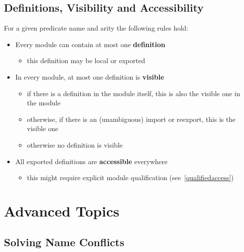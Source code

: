 \subsection{Definitions, Visibility and Accessibility}

For a given predicate name and arity the following rules hold:

\begin{itemize}
\item Every module can contain at most one {\bf definition}
    \begin{itemize}
    \item this definition may be local or exported
    \end{itemize}
\item In every module, at most one definition is {\bf visible}
    \begin{itemize}
    \item if there is a definition in the module itself,
	this is also the visible one in the module
    \item otherwise, if there is an (unambiguous) import or reexport,
	this is the visible one
    \item otherwise no definition is visible
    \end{itemize}
\item All exported definitions are {\bf accessible} everywhere
    \begin{itemize}
    \item this might require explicit module qualification
	(see~\ref{qualifiedaccess})
    \end{itemize}
\end{itemize}


\section{Advanced Topics}
\subsection{Solving Name Conflicts}

